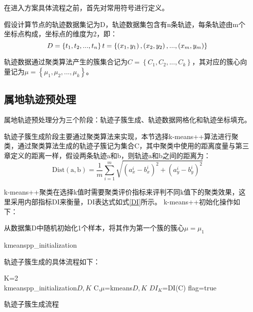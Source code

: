 在进入方案具体流程之前，首先对常用符号进行定义。

假设计算节点的轨迹数据集记为D，轨迹数据集包含有n条轨迹，每条轨迹由m个坐标点构成，坐标点的维度为2，即：
\[
D=\left\{ t_1,t_2,...,t_n \right\} 
\\
t=\left\{ \left( x_1,y_1 \right) ,\left( x_2,y_2 \right) ,...,\left( x_m,y_m \right) \right\} 
\]

轨迹数据通过聚类算法产生的簇集合记为$C=\left\{ C_1,C_2,...,C_k \right\} $，其对应的簇心向量记为$\mu =\left\{ \mu _1,\mu _2,...,\mu _k \right\} $。


\subsection{属地轨迹预处理}

属地轨迹预处理分为三个阶段：轨迹子簇生成、轨迹数据网格化和轨迹坐标填充。

轨迹子簇生成阶段主要通过聚类算法来实现，本节选择k-means++算法进行聚类，通过聚类算法生成的轨迹子簇记为集合C，其中聚类中使用的距离度量与第三章定义的距离一样，假设两条轨迹a和b，则轨迹a和b之间的距离为：
\[
\text{Dist}\left( \text{a},\text{b} \right) =\frac{1}{m}\sum_{i=1}^m{\sqrt{\left( a_{x}^{i}-b_{x}^{i} \right) ^2+\left( a_{y}^{i}-b_{y}^{i} \right) ^2}}
\]

k-means++聚类在选择k值时需要聚类评价指标来评判不同k值下的聚类效果，这里采用内部指标DI来衡量，DI表达式如式\ref{DI}所示。
k-means++初始化操作如下：\\
\begin{algorithm}[H]
	 从数据集D中随机初始化1个样本，将其作为第一个簇的簇心$\mu={\mu_1}$\;
	 \caption{kmeanspp_initialization}
\end{algorithm}

轨迹子簇生成的具体流程如下：\\
\begin{algorithm}[H]
	\label{kmeanspp}
	 K=2\;\\
	 kmeanspp_initialization\(D,K\)\;
	 C,$\mu$=kmeans\(D,K\)\;
	 $DI_K$=DI(C)\;
	 flag=true\;
	 \caption{轨迹子簇生成流程}
\end{algorithm}

